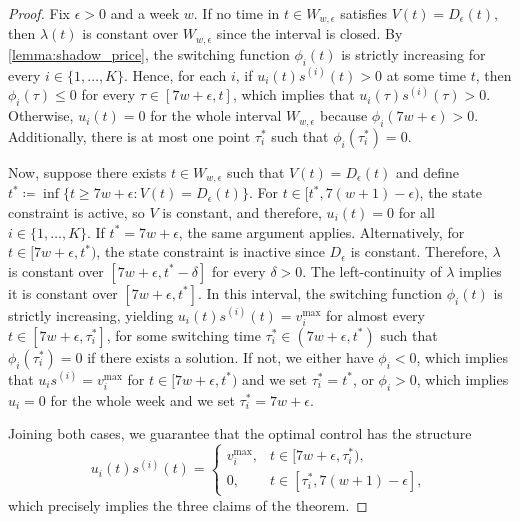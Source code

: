 \documentclass[letterpaper, 10 pt, conference]{ieeeconf}
\newcommand{\fori}[1]{#1 \in \{1,\dots, K\}}
\begin{document}
\begin{proof}
    Fix $\epsilon>0$ and a week $w$. 
    If no time in $t \in W_{w,\epsilon}$ satisfies $V(t)=D_\epsilon(t)$, then $\lambda(t)$ is constant over $W_{w,\epsilon}$ since the interval is closed.
    By \autoref{lemma:shadow_price}, the switching function $\phi_i(t)$ is strictly increasing for every $\fori{i}$.
    Hence, for each $i$, if $u_i(t)s^{(i)}(t) > 0$ at some time $t$, then $\phi_i(\tau) \le 0$ for every $\tau \in [7w+\epsilon, t]$, which implies that $u_i(\tau)s^{(i)}(\tau) > 0$.
    Otherwise, $u_i(t) = 0$ for the whole interval $W_{w,\epsilon}$ because $\phi_i(7w+\epsilon) > 0$.
    Additionally, there is at most one point $\tau^*_i$ such that $\phi_i(\tau_i^*) = 0$.
    
    Now, suppose there exists $t\in W_{w,\epsilon}$ such that $V(t)=D_\epsilon(t)$ and define $t^* \coloneqq \inf\{t \ge 7w+\epsilon: V(t)=D_\epsilon(t)\}$.
    For $t \in  [t^*,7(w+1)-\epsilon)$, the state constraint is active, so $V$ is constant, and therefore, $u_i(t) = 0$ for all $\fori{i}$.
    If $t^* = 7w + \epsilon$, the same argument applies. 
    Alternatively, for $t\in [7w+\epsilon,t^*)$, the state constraint is inactive since $D_{\epsilon}$ is constant.
    Therefore, $\lambda$ is constant over $[7w+\epsilon,t^*-\delta]$ for every $\delta > 0$.
    The left-continuity of $\lambda$ implies it is constant over $[7w+\epsilon,t^*]$.
    In this interval, the switching function $\phi_i(t)$ is strictly increasing, yielding $u_i(t)s^{(i)}(t)=v_i^{\max}$ for almost every $t \in [7w+\epsilon,\tau_i^*]$, for some switching time $\tau_i^* \in (7w+\epsilon, t^*)$ such that $\phi_i(\tau_i^*) = 0$ if there exists a solution.
    If not, we either have $\phi_i < 0$, which implies that $u_i s^{(i)} = v_i^{\max}$ for $t \in [7w + \epsilon, t^*)$ and we set $\tau_i^* = t^*$, or $\phi_i > 0$, which implies $u_i = 0$ for the whole week and we set $\tau_i^* = 7w + \epsilon$.

    Joining both cases, we guarantee that the optimal control has the structure
    \[
    u_i(t)s^{(i)}(t)=
    \begin{cases}
    v_i^{\max}, & t\in [7w+\epsilon,\tau_i^*), \\
    0, & t\in [\tau_i^*,7(w+1)-\epsilon],
    \end{cases}
    \]
    which precisely implies the three claims of the theorem.
\end{proof}
\end{document}
